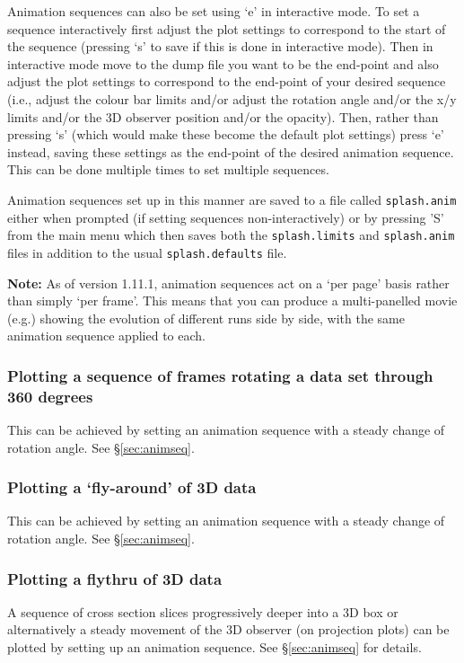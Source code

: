 \documentclass[a4paper,10pt]{article}
\begin{document}
 Animation sequences can also be set using `e' in interactive mode. To set a sequence interactively first adjust the plot settings to correspond to the start of the sequence (pressing `s' to save if this is done in interactive mode). Then in interactive mode move to the dump file you want to be the end-point and also adjust the plot settings to correspond to the end-point of your desired sequence (i.e., adjust the colour bar limits and/or adjust the rotation angle and/or the x/y limits and/or the 3D observer position and/or the opacity). Then, rather than pressing `s' (which would make these become the default plot settings) press `e' instead, saving these settings as the end-point of the desired animation sequence. This can be done multiple times to set multiple sequences.
 
  Animation sequences set up in this manner are saved to a file called \verb+splash.anim+ either when prompted (if setting sequences non-interactively) or by pressing 'S' from the main menu which then saves both the \verb+splash.limits+ and \verb+splash.anim+ files in addition to the usual \verb+splash.defaults+ file.
  
  \textbf{Note:} As of version 1.11.1, animation sequences act on a `per page' basis rather than simply `per frame'. This means that you can produce a multi-panelled movie (e.g.) showing the evolution of different runs side by side, with the same animation sequence applied to each.

\subsubsection{ Plotting a sequence of frames rotating a data set through 360 degrees}
This can be achieved by setting an animation sequence with a steady change of rotation angle. See \S\ref{sec:animseq}.

\subsubsection{ Plotting a `fly-around' of 3D data}
This can be achieved by setting an animation sequence with a steady change of rotation angle. See \S\ref{sec:animseq}.

\subsubsection{ Plotting a flythru of 3D data}
 A sequence of cross section slices progressively deeper into a 3D box or alternatively a steady movement of the 3D observer (on projection plots) can be plotted by setting up an animation sequence. See \S\ref{sec:animseq} for details.
\end{document}
